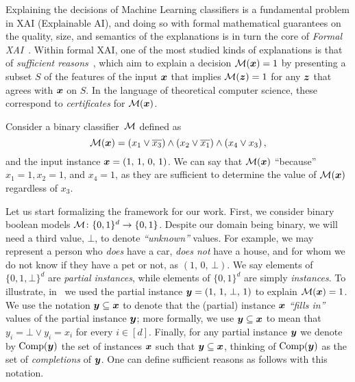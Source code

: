 Explaining the decisions of Machine Learning classifiers is a fundamental problem in XAI (Explainable AI), and doing so with formal mathematical guarantees on the quality, size, and semantics of the explanations is in turn the core of \emph{Formal XAI}~\citep{formal-xai}. 
Within formal XAI, one of the most studied kinds of explanations is that of \emph{sufficient reasons}~\citep{Darwiche_Hirth_2020}, which aim to explain a decision $\mathcal{M}({\bm{x}}) = 1$ by presenting a subset $S$ of the features of the input ${\bm{x}}$ that implies $\mathcal{M}({\bm{z}}) = 1$  for any ${\bm{z}}$ that agrees with ${\bm{x}}$ on $S$. 
In the language of theoretical computer science, these correspond to \emph{certificates} for $\mathcal{M}({\bm{x}})$.

\begin{example}
Consider a binary classifier~$\mathcal{M}$ defined as 
	\[
	\mathcal{M}({\bm{x}}) = \left(x_1 \lor \overline{x_3}\right) \land   \left(x_2 \lor \overline{x_1}\right) \land \left(x_4 \lor x_3\right),
	\]
	and the input instance ${\bm{x}} = \left( 1, \,  1, \, 0, \, 1 \right)$. We can say that $\mathcal{M}({\bm{x}})$ ``because'' $x_1 = 1, x_2 = 1$, and $x_4 = 1$, as they are sufficient to determine the value of $\mathcal{M}({\bm{x}})$ regardless of $x_3$.
	\label{ex:sufficient-reason}
\end{example}

Let us start formalizing the framework for our work.  First, we consider binary boolean models $\mathcal{M}\colon \{0, 1\}^d \to \{0, 1\}$. Despite our domain being binary, we will need a third value, $\bot$, to denote \emph{``unknown''} values.  For example, we may represent a person who \emph{does} have a car, \emph{does not} have a house, and for whom we do not know if they have a pet or not, as $\left(1, \, 0, \, \bot\right)$. 
We say elements of $\{0, 1, \bot\}^d$ are \emph{partial instances}, while elements of $\{0, 1\}^d$ are simply \emph{instances}. To illustrate, in~ we used the partial instance ${\bm{y}} = \left(1, \, 1, \, \bot, \, 1 \right)$ to explain $\mathcal{M}({\bm{x}}) = 1$.
We use the notation ${\bm{y}} \subseteq {\bm{x}}$ to denote that the (partial) instance ${\bm{x}}$ \emph{``fills in''} values of the partial instance ${\bm{y}}$; more formally, we use ${\bm{y}} \subseteq {\bm{x}}$ to mean that $y_i = \bot \lor y_i = x_i$ for every $i \in [d]$. Finally, for any partial instance ${\bm{y}}$ we denote by $\operatorname{Comp}({\bm{y}})$ the set of instances ${\bm{x}}$ such that ${\bm{y}} \subseteq {\bm{x}}$, thinking of $\operatorname{Comp}({\bm{y}})$ as the set of \emph{completions} of ${\bm{y}}$. One can define sufficient reasons as follows with this notation.

